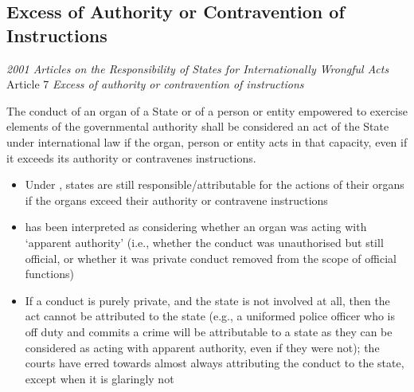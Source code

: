 \subsection{Excess of Authority or Contravention of Instructions}

\begin{conventiondetails}{\textit{2001 Articles on the Responsibility of States for Internationally Wrongful Acts} Article 7}
    \flushleft
    \textit{Excess of authority or contravention of instructions}

    \vspace{\baselineskip}

    The conduct of an organ of a State or of a person or entity empowered to exercise elements of the governmental authority shall be considered an act of the State under international law if the organ, person or entity acts in that capacity, even if it exceeds its authority or contravenes instructions.
\end{conventiondetails}

\begin{itemize}
    \item Under , states are still responsible/attributable for the actions of their organs if the organs exceed their authority or contravene instructions
    \item {} has been interpreted as considering whether an organ was acting with `apparent authority' (i.e., whether the conduct was unauthorised but still official, or whether it was private conduct removed from the scope of official functions)
    \item If a conduct is purely private, and the state is not involved at all, then the act cannot be attributed to the state (e.g., a uniformed police officer who is off duty and commits a crime will be attributable to a state as they can be considered as acting with apparent authority, even if they were not); the courts have erred towards almost always attributing the conduct to the state, except when it is glaringly not 
\end{itemize}

